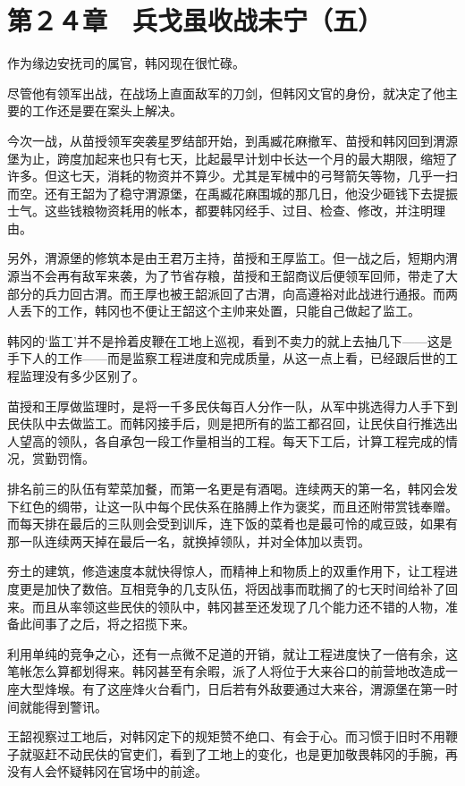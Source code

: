 \section{第２４章　兵戈虽收战未宁（五） }

作为缘边安抚司的属官，韩冈现在很忙碌。

尽管他有领军出战，在战场上直面敌军的刀剑，但韩冈文官的身份，就决定了他主要的工作还是要在案头上解决。

今次一战，从苗授领军突袭星罗结部开始，到禹臧花麻撤军、苗授和韩冈回到渭源堡为止，跨度加起来也只有七天，比起最早计划中长达一个月的最大期限，缩短了许多。但这七天，消耗的物资并不算少。尤其是军械中的弓弩箭矢等物，几乎一扫而空。还有王韶为了稳守渭源堡，在禹臧花麻围城的那几日，他没少砸钱下去提振士气。这些钱粮物资耗用的帐本，都要韩冈经手、过目、检查、修改，并注明理由。

另外，渭源堡的修筑本是由王君万主持，苗授和王厚监工。但一战之后，短期内渭源当不会再有敌军来袭，为了节省存粮，苗授和王韶商议后便领军回师，带走了大部分的兵力回古渭。而王厚也被王韶派回了古渭，向高遵裕对此战进行通报。而两人丢下的工作，韩冈也不便让王韶这个主帅来处置，只能自己做起了监工。

韩冈的‘监工’并不是拎着皮鞭在工地上巡视，看到不卖力的就上去抽几下——这是手下人的工作——而是监察工程进度和完成质量，从这一点上看，已经跟后世的工程监理没有多少区别了。

苗授和王厚做监理时，是将一千多民伕每百人分作一队，从军中挑选得力人手下到民伕队中去做监工。而韩冈接手后，则是把所有的监工都召回，让民伕自行推选出人望高的领队，各自承包一段工作量相当的工程。每天下工后，计算工程完成的情况，赏勤罚惰。

排名前三的队伍有荤菜加餐，而第一名更是有酒喝。连续两天的第一名，韩冈会发下红色的绸带，让这一队中每个民伕系在胳膊上作为褒奖，而且还附带赏钱奉赠。而每天排在最后的三队则会受到训斥，连下饭的菜肴也是最可怜的咸豆豉，如果有那一队连续两天掉在最后一名，就换掉领队，并对全体加以责罚。

夯土的建筑，修造速度本就快得惊人，而精神上和物质上的双重作用下，让工程进度更是加快了数倍。互相竞争的几支队伍，将因战事而耽搁了的七天时间给补了回来。而且从率领这些民伕的领队中，韩冈甚至还发现了几个能力还不错的人物，准备此间事了之后，将之招揽下来。

利用单纯的竞争之心，还有一点微不足道的开销，就让工程进度快了一倍有余，这笔帐怎么算都划得来。韩冈甚至有余暇，派了人将位于大来谷口的前营地改造成一座大型烽堠。有了这座烽火台看门，日后若有外敌要通过大来谷，渭源堡在第一时间就能得到警讯。

王韶视察过工地后，对韩冈定下的规矩赞不绝口、有会于心。而习惯于旧时不用鞭子就驱赶不动民伕的官吏们，看到了工地上的变化，也是更加敬畏韩冈的手腕，再没有人会怀疑韩冈在官场中的前途。

